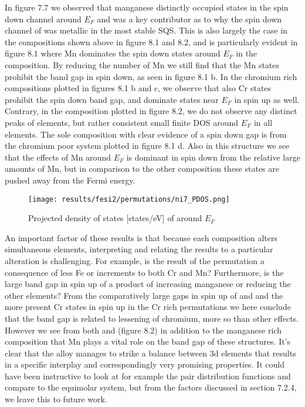 In figure 7.7 we observed that manganese distinctly occupied states in the spin down channel around $E_F$ and was a key contributor as to why the spin down channel of  was metallic in the most stable SQS. This is also largely the case in the compositions shown above in figure 8.1 and 8.2, and is particularly evident in figure 8.1 where Mn dominates the spin down states around $E_F$ in the  composition. By reducing the number of Mn we still find that the Mn states prohibit the band gap in spin down, as seen in figure 8.1 b. In the chromium rich compositions plotted in figures 8.1 b and c, we observe that also Cr states prohibit the spin down band gap, and dominate states near $E_F$ in spin up as well. Contrary, in the  composition plotted in figure 8.2, we do not observe any distinct peaks of elements, but rather consistent small finite DOS around $E_F$ in all elements.  The sole composition with clear evidence of a spin down gap is from the chromium poor system plotted in figure 8.1 d. Also in this structure we see that the effects of Mn around $E_F$ is dominant in spin down from the relative large amounts of Mn, but in comparison to the other composition these states are pushed away from the Fermi energy.

\begin{figure}[H]
	\centering
	\texttt{[image: results/fesi2/permutations/ni7\_PDOS.png]}
	\caption{Projected density of states [states/eV] of  around $E_F$}
\end{figure}

An important factor of these results is that because each composition alters simultaneous elements, interpreting and relating the results to a particular alteration is challenging. For example, is the result of the  permutation a consequence of less Fe or increments to both Cr and Mn? Furthermore, is the large band gap in spin up of  a product of increasing manganese or reducing the other elements? From the comparatively large gaps in spin up of  and  and the more present Cr states in spin up in the Cr rich permutations we here conclude that the band gap is related to lessening of chromium, more so than other effects. However we see from both  and  (figure 8.2) in addition to the manganese rich composition that Mn plays a vital role on the band gap of these structures. It's clear that the  alloy manages to strike a balance between 3d elements that results in a specific interplay and correspondingly very promising properties. It could have been instructive to look at for example the pair distribution functions and compare to the equimolar system, but from the factors discussed in section 7.2.4, we leave this to future work. 

